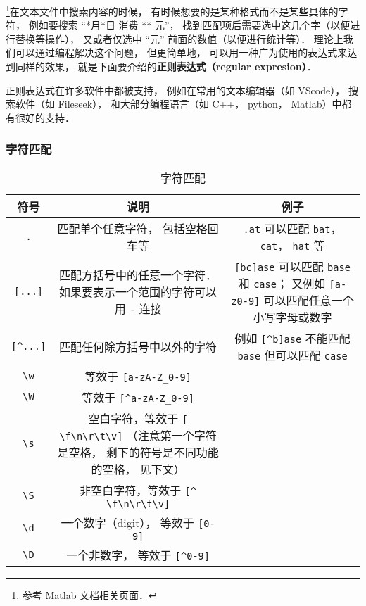 
\begin{issues}
\issueDraft
\end{issues}


\footnote{参考 Matlab 文档\href{https://www.mathworks.com/help/matlab/ref/regexp.html}{相关页面}．}在文本文件中搜索内容的时候， 有时候想要的是某种格式而不是某些具体的字符， 例如要搜索 “*月*日 消费 ** 元”， 找到匹配项后需要选中这几个字（以便进行替换等操作）， 又或者仅选中 “元” 前面的数值（以便进行统计等）． 理论上我们可以通过编程解决这个问题， 但更简单地， 可以用一种广为使用的表达式来达到同样的效果， 就是下面要介绍的\textbf{正则表达式（regular expresion）}．

正则表达式在许多软件中都被支持， 例如在常用的文本编辑器（如 VScode）， 搜索软件（如 Fileseek）， 和大部分编程语言（如 C++， python， Matlab）中都有很好的支持．

\subsubsection{字符匹配}
\begin{table}[ht]
\centering
\caption{字符匹配}\label{regex_tab1}
\begin{tabular}{|c|c|c|}
\hline
符号 & 说明 & 例子 \\
\hline
\verb|.| & 匹配单个任意字符， 包括空格回车等 & \verb|.at| 可以匹配 \verb|bat|， \verb|cat|， \verb|hat| 等 \\
\hline
\verb|[...]| & 匹配方括号中的任意一个字符． 如果要表示一个范围的字符可以用 \verb|-| 连接 & \verb|[bc]ase| 可以匹配 \verb|base| 和 \verb|case|； 又例如 \verb|[a-z0-9]| 可以匹配任意一个小写字母或数字 \\
\hline
\verb|[^...]| & 匹配任何除方括号中以外的字符 & 例如 \verb|[^b]ase| 不能匹配 \verb|base| 但可以匹配 \verb|case| \\
\hline
\verb|\w| & 等效于 \verb|[a-zA-Z_0-9]| &  \\
\hline
\verb|\W| & 等效于 \verb|[^a-zA-Z_0-9]| &  \\
\hline
\verb|\s| & 空白字符，等效于 \verb|[ \f\n\r\t\v]| （注意第一个字符是空格， 剩下的符号是不同功能的空格， 见下文） &  \\
\hline
\verb|\S| & 非空白字符，等效于 \verb|[^ \f\n\r\t\v]| & \\
\hline
\verb|\d| & 一个数字（digit）， 等效于 \verb|[0-9]| & \\
\hline
\verb|\D| & 一个非数字， 等效于 \verb|[^0-9]| & \\
\hline
\end{tabular}
\end{table}

